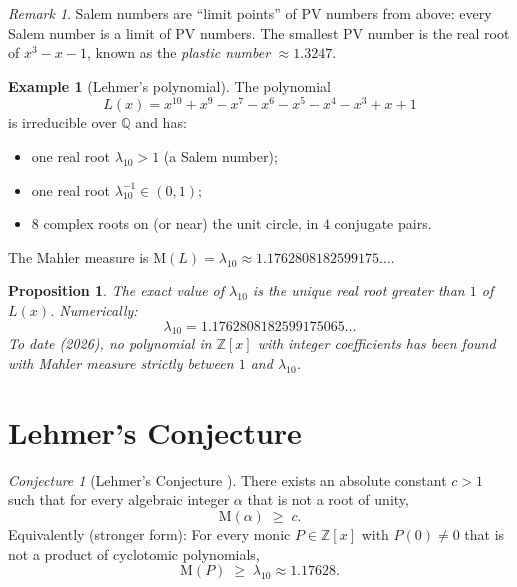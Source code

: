 \documentclass[12pt,a4paper]{amsart}
\newtheorem{proposition}[theorem]{Proposition}
\theoremstyle{definition}
\newtheorem{example}[theorem]{Example}
\theoremstyle{remark}
\newtheorem{remark}[theorem]{Remark}
\newtheorem{conjecture}[theorem]{Conjecture}
\newcommand{\Z}{\mathbb{Z}}
\newcommand{\Q}{\mathbb{Q}}
\newcommand{\M}{\mathrm{M}}
\begin{document}
\begin{remark}
  Salem numbers are ``limit points'' of PV numbers from above: every Salem number is a
  limit of PV numbers. The smallest PV number is the real root of $x^3 - x - 1$,
  known as the \emph{plastic number} $\approx 1.3247$.
\end{remark}

\begin{example}[Lehmer's polynomial]
  The polynomial
  \[
    L(x) = x^{10}+x^9-x^7-x^6-x^5-x^4-x^3+x+1
  \]
  is irreducible over $\Q$ and has:
  \begin{itemize}
    \item one real root $\lambda_{10} > 1$ (a Salem number);
    \item one real root $\lambda_{10}^{-1} \in (0,1)$;
    \item $8$ complex roots on (or near) the unit circle, in $4$ conjugate pairs.
  \end{itemize}
  The Mahler measure is $\M(L) = \lambda_{10} \approx 1.1762808182599175\ldots$.
\end{example}

\begin{proposition}
  The exact value of $\lambda_{10}$ is the unique real root greater than $1$ of $L(x)$.
  Numerically:
  \[
    \lambda_{10} = 1.1762808182599175065\ldots
  \]
  To date (2026), no polynomial in $\Z[x]$ with integer coefficients has been found with
  Mahler measure strictly between $1$ and $\lambda_{10}$.
\end{proposition}

\section{Lehmer's Conjecture}\label{sec:lehmer_problem}

\begin{conjecture}[Lehmer's Conjecture \cite{Lehmer1933}]\label{conj:lehmer}
  There exists an absolute constant $c > 1$ such that for every algebraic integer
  $\alpha$ that is not a root of unity,
  \[
    \M(\alpha) \;\geq\; c.
  \]
  Equivalently (stronger form): For every monic $P \in \Z[x]$ with $P(0) \neq 0$ that
  is not a product of cyclotomic polynomials,
  \[
    \M(P) \;\geq\; \lambda_{10} \approx 1.17628.
  \]
\end{conjecture}
\end{document}
